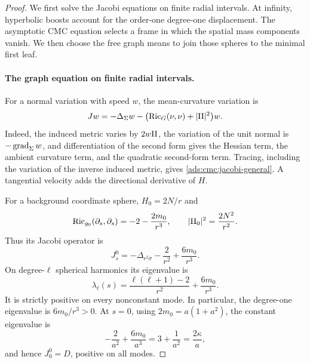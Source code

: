 \begin{proof}
We first solve the Jacobi equations on finite radial intervals.
At infinity, hyperbolic boosts account for the order-one degree-one
displacement. The asymptotic CMC equation selects a frame in which the
spatial mass components vanish. We then choose the free graph means
to join those spheres to the minimal first leaf.

\paragraph{The graph equation on finite radial intervals.}
For a normal variation with speed \(w\), the mean-curvature variation is
\begin{equation}\label{ads:cmc:jacobi-general}
 Jw=-\Delta_{\Sigma}w
 -\bigl(\operatorname{Ric}_G(\nu,\nu)+|\mathrm{II}|^2\bigr)w.
\end{equation}
Indeed, the induced metric varies by \(2w\mathrm{II}\), the variation of the
unit normal is \(-\operatorname{grad}_\Sigma w\), and differentiation of the second
form gives the Hessian term, the ambient curvature term, and the
quadratic second-form term.  Tracing, including the variation of the
inverse induced metric, gives \eqref{ads:cmc:jacobi-general}.  A tangential
velocity adds the directional derivative of \(H\).

For a background coordinate sphere, \(H_0=2N/r\) and
\[
 \operatorname{Ric}_{g_0}(\partial_s,\partial_s)=-2-\frac{2m_0}{r^3},
 \qquad |\mathrm{II}_0|^2=\frac{2N^2}{r^2}.
\]
Thus its Jacobi operator is
\begin{equation}\label{ads:cmc:background-jacobi}
 J_s^0=-\Delta_{r^2\sigma}-\frac2{r^2}+\frac{6m_0}{r^3}.
\end{equation}
On degree-\(\ell\) spherical harmonics its eigenvalue is
\begin{equation}\label{ads:cmc:jacobi-eigenvalues}
 \lambda_\ell(s)
 =\frac{\ell(\ell+1)-2}{r^2}+\frac{6m_0}{r^3}.
\end{equation}
It is strictly positive on every nonconstant mode.  In particular,
the degree-one eigenvalue is \(6m_0/r^3>0\).
At \(s=0\), using \(2m_0=a(1+a^2)\), the constant eigenvalue is
\[
 -\frac2{a^2}+\frac{6m_0}{a^3}
 =3+\frac1{a^2}=\frac{2\kappa}{a},
\]
and hence \(J_0^0=D\), positive on all modes.


\end{proof}
